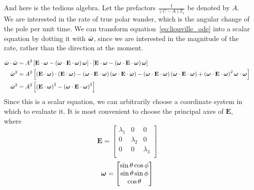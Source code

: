 \documentclass[extra,mreferee]{gji}
\begin{document}
And here is the tedious algebra.  Let the prefactors $\frac{1}{(C-A)T_1}$ be denoted by $A$.
We are interested in the rate of true polar wander, which is the angular change of the pole
per unit time. We can transform equation~\ref{eq:liouville_ode} into a scalar equation by dotting it
with $\dot{\mitbf{\omega}}$, since we are interested in the magnitude of the rate, rather than
the direction at the moment.

\begin{equation}
\begin{aligned}
\dot{\mitbf{\omega}} \cdot \dot{\mitbf{\omega}} &= 
A^2 \left[ \mathbf{E}\cdot \mitbf{\omega} - \left(\mitbf{\omega} \cdot \mathbf{E} \cdot \mitbf{\omega} \right)\mitbf{\omega}\right]
\cdot \left[ \mathbf{E}\cdot \mitbf{\omega} - \left(\mitbf{\omega} \cdot \mathbf{E} \cdot \mitbf{\omega} \right)\mitbf{\omega}\right] \\
\dot{\mitbf{\omega}}^2  &= 
A^2 \left[ \left(\mathbf{E}\cdot \mitbf{\omega}\right)\cdot \left(\mathbf{E}\cdot \mitbf{\omega}\right)
 - \left(\mitbf{\omega} \cdot \mathbf{E} \cdot \mitbf{\omega} \right) \left( \mitbf{\omega}\cdot \mathbf{E} \cdot \mitbf{\omega} \right) 
 - \left(\mitbf{\omega} \cdot \mathbf{E} \cdot \mitbf{\omega} \right) \left( \mitbf{\omega}\cdot \mathbf{E} \cdot \mitbf{\omega} \right) 
 + \left(\mitbf{\omega} \cdot \mathbf{E} \cdot \mitbf{\omega} \right)^2 \mitbf{\omega}\cdot \mitbf{\omega} 
\right]\\
\dot{\mitbf{\omega}}^2  &= 
A^2 \left[ \left(\mathbf{E}\cdot \mitbf{\omega}\right)^2
 - \left(\mitbf{\omega} \cdot \mathbf{E} \cdot \mitbf{\omega} \right)^2 
\right]\\
\end{aligned}
\end{equation}
Since this is a scalar equation, we can arbitrarily choose a coordinate system in which to evaluate it.
It is most convenient to choose the principal axes of $\mathbf{E}$, where
\begin{equation}
\mathbf{E} = 
\begin{bmatrix}
\lambda_1 & 0 & 0 \\
0 & \lambda_2 & 0 \\
0 & 0 & \lambda_3 \\
\end{bmatrix}
\end{equation}
\begin{equation}
\mitbf{\omega} = 
\begin{bmatrix}
\sin{\theta} \cos{\phi} \\
\sin{\theta} \sin{\phi} \\
\cos{\theta} \\
\end{bmatrix}
\end{equation}
\end{document}
